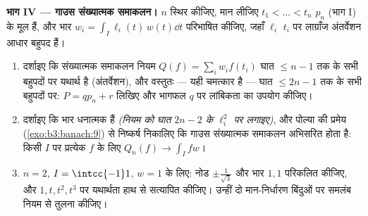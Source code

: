 \begin{problem}
\medskip
\noindent\textbf{भाग IV --- गाउस संख्यात्मक समाकलन।} $n$ स्थिर
कीजिए, मान लीजिए $t_1 < \dots < t_n$ $p_n$ (भाग I) के मूल हैं, और भार $w_i = \int_I \ell_i(t)\,w(t)\dd t$
परिभाषित कीजिए, जहाँ $\ell_i$ $t_i$ पर लाग्राँज अंतर्वेशन आधार बहुपद
हैं।
\begin{enumerate}[resume]
  \item दर्शाइए कि संख्यात्मक समाकलन नियम $Q(f) = \sum_iw_if(t_i)$ घात $\leq n - 1$ तक के
        सभी बहुपदों पर यथार्थ है (अंतर्वेशन), और वस्तुतः ---
        यही चमत्कार है --- घात $\leq 2n - 1$ तक के सभी बहुपदों पर: $P =
        qp_n + r$
        लिखिए और भागफल $q$ पर लांबिकता का उपयोग कीजिए।
  \item दर्शाइए कि भार धनात्मक हैं \emph{(नियम को घात $2n -
        2$ के
        $\ell_i^2$ पर लगाइए)}, और पोल्या की प्रमेय (\cref{exo:b3:banach:9}) से निष्कर्ष
        निकालिए कि गाउस संख्यात्मक समाकलन अभिसरित होता है: किसी
         $I$ पर प्रत्येक  $f$ के लिए $Q_n(f) \to \int_I fw$।
  \item $n = 2$, $I = \intcc{-1}1$, $w = 1$ के लिए: नोड $\pm\frac1{\sqrt3}$ और भार $1, 1$
        परिकलित कीजिए, और $1, t, t^2, t^3$ पर यथार्थता हाथ से सत्यापित
        कीजिए। उन्हीं दो मान-निर्धारण बिंदुओं पर समलंब नियम से
        तुलना कीजिए।
\end{enumerate}


\end{problem}
